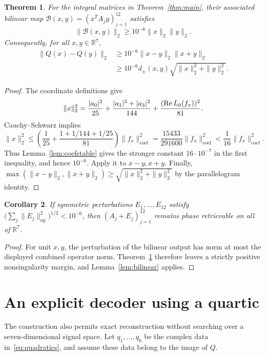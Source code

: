 \documentclass[11pt]{article}
\newtheorem{theorem}{Theorem}
\newtheorem{corollary}[theorem]{Corollary}
\theoremstyle{remark}\newtheorem{remark}[theorem]{Remark}
\newcommand{\R}{\mathbb R}\newcommand{\C}{\mathbb C}
\newcommand{\coef}{\mathrm{coef}}
\begin{document}
\begin{theorem}\label{thm:stable}
For the integral matrices in Theorem~\ref{thm:main}, their associated bilinear map $\mathcal B(x,y)=(x^TA_jy)_{j=1}^{12}$ satisfies
\[
 \|\mathcal B(x,y)\|_2\ge10^{-6}\|x\|_2\|y\|_2.
\]
Consequently, for all $x,y\in\R^7$,
\begin{align*}
 \|Q(x)-Q(y)\|_2
 &\ge10^{-6}\|x-y\|_2\|x+y\|_2\\
 &\ge10^{-6}d_{\pm}(x,y)
       \sqrt{\|x\|_2^2+\|y\|_2^2}.
\end{align*}
\end{theorem}
\begin{proof}
The coordinate definitions give
\[
 \|x\|_2^2=\frac{|a_0|^2}{25}
  +\frac{|a_1|^2+|a_3|^2}{144}
  +\frac{(\operatorname{Re} L_0(f_x))^2}{81}.
\]
Cauchy--Schwarz implies
\[
 \|x\|_2^2\le
 \left(\frac1{25}+\frac{1+1/144+1/25}{81}\right)\|f_x\|_{\coef}^2
 =\frac{15433}{291600}\|f_x\|_{\coef}^2
 <\frac1{16}\|f_x\|_{\coef}^2.
\]
Thus Lemma~\ref{lem:coefstable} gives the stronger constant $16\cdot10^{-7}$ in the first inequality, and hence $10^{-6}$. Apply it to $x-y,x+y$. Finally,
$\max(\|x-y\|_2,\|x+y\|_2)\ge\sqrt{\|x\|_2^2+\|y\|_2^2}$ by the parallelogram identity.
\end{proof}

\begin{corollary}
If symmetric perturbations $E_1,\ldots,E_{12}$ satisfy
$\bigl(\sum_j\|E_j\|_{\mathrm{op}}^2\bigr)^{1/2}<10^{-6}$,
then $(A_j+E_j)_{j=1}^{12}$ remains phase retrievable on all of $\R^7$.
\end{corollary}
\begin{proof}
For unit $x,y$, the perturbation of the bilinear output has norm at most the displayed combined operator norm. Theorem~\ref{thm:stable} therefore leaves a strictly positive nonsingularity margin, and Lemma~\ref{lem:bilinear} applies.
\end{proof}

\section{An explicit decoder using a quartic}
The construction also permits exact reconstruction without searching over a seven-dimensional signal space. Let $q_1,\ldots,q_6$ be the complex data in~\eqref{eq:quadratics}, and assume these data belong to the image of $Q$.
\end{document}
